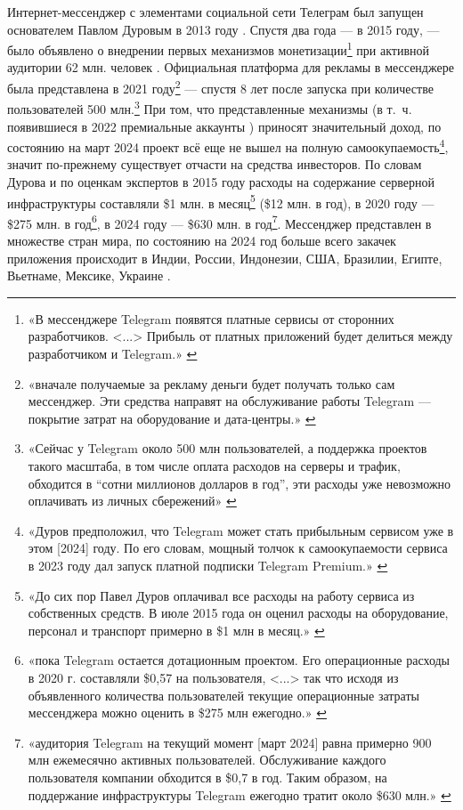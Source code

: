 \documentclass{article}
\begin{document}
Интернет-мессенджер с элементами социальной сети Телеграм был запущен основателем Павлом Дуровым в 2013 году \cite{telegramStartup2013}. Спустя два года — в 2015 году, — было объявлено о внедрении первых механизмов монетизации\footnote{«В мессенджере Telegram появятся платные сервисы от сторонних разработчиков. <...> Прибыль от платных приложений будет делиться между разработчиком и Telegram.» \cite{telegramMonetizationApps2015}} при активной аудитории 62 млн. человек \cite{telegramMonetizationApps2015}. Официальная платформа для рекламы в мессенджере была представлена в 2021 году\footnote{«вначале получаемые за рекламу деньги будет получать только сам мессенджер. Эти средства направят на обслуживание работы Telegram — покрытие затрат на оборудование и дата-центры.» \cite{telegramMonetizationAdvert2021}} — спустя 8 лет после запуска при количестве пользователей 500 млн.\footnote{«Сейчас у Telegram около 500 млн пользователей, а поддержка проектов такого масштаба, в том числе оплата расходов на серверы и трафик, обходится в “сотни миллионов долларов в год”, эти расходы уже невозможно оплачивать из личных сбережений» \cite{telegramAnnounceAdvert2020}} При том, что представленные механизмы (в т.~ч. появившиеся в 2022 премиальные аккаунты \cite{telegramPremium2022}) приносят значительный доход, по состоянию на март 2024 проект всё еще не вышел на полную самоокупаемость\footnote{«Дуров предположил, что Telegram может стать прибыльным сервисом уже в этом [2024] году. По его словам, мощный толчок к самоокупаемости сервиса в 2023 году дал запуск платной подписки Telegram Premium.» \cite{telegramIpoPlans2024}}, значит по-прежнему существует отчасти на средства инвесторов. По словам Дурова и по оценкам экспертов в 2015 году расходы на содержание серверной инфраструктуры составляли \$1 млн. в месяц\footnote{«До сих пор Павел Дуров оплачивал все расходы на работу сервиса из собственных средств. В июле 2015 года он оценил расходы на оборудование, персонал и транспорт примерно в \$1 млн в месяц.» \cite{telegramMonetizationApps2015}} (\$12 млн. в год), в 2020 году — \$275 млн. в год\footnote{«пока Telegram остается дотационным проектом. Его операционные расходы в 2020 г. составляли \$0,57 на пользователя, <...> так что исходя из объявленного количества пользователей текущие операционные затраты мессенджера можно оценить в \$275 млн ежегодно.» \cite{telegramIpoPlans2021}}, в 2024 году — \$630 млн. в год\footnote{«аудитория Telegram на текущий момент [март 2024] равна примерно 900 млн ежемесячно активных пользователей. Обслуживание каждого пользователя компании обходится в \$0,7 в год. Таким образом, на поддержание инфраструктуры Telegram ежегодно тратит около \$630 млн.» \cite{telegramIpoPlans2024}}. Мессенджер представлен в множестве стран мира, по состоянию на 2024 год больше всего закачек приложения происходит в Индии, России, Индонезии, США, Бразилии, Египте, Вьетнаме, Мексике, Украине \cite{telegramWorldStats2024}.
\end{document}
